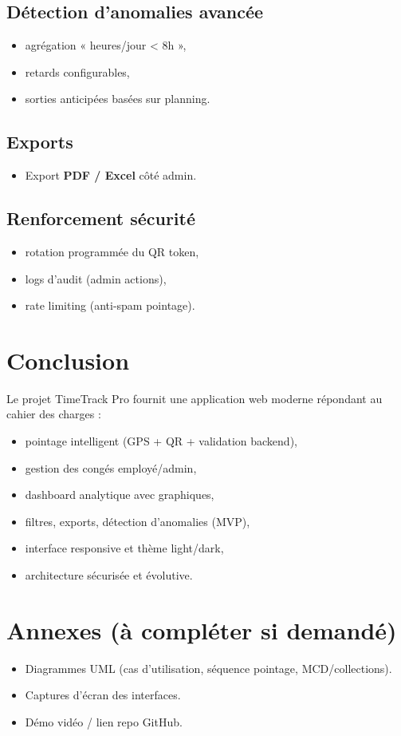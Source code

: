 \documentclass[12pt,a4paper]{article}
\begin{document}
\subsection{Détection d’anomalies avancée}
\begin{itemize}[leftmargin=*]
  \item agrégation « heures/jour < 8h »,
  \item retards configurables,
  \item sorties anticipées basées sur planning.
\end{itemize}

\subsection{Exports}
\begin{itemize}[leftmargin=*]
  \item Export \textbf{PDF / Excel} côté admin.
\end{itemize}

\subsection{Renforcement sécurité}
\begin{itemize}[leftmargin=*]
  \item rotation programmée du QR token,
  \item logs d’audit (admin actions),
  \item rate limiting (anti-spam pointage).
\end{itemize}

\section{Conclusion}
Le projet TimeTrack Pro fournit une application web moderne répondant au cahier des charges :
\begin{itemize}[leftmargin=*]
  \item pointage intelligent (GPS + QR + validation backend),
  \item gestion des congés employé/admin,
  \item dashboard analytique avec graphiques,
  \item filtres, exports, détection d’anomalies (MVP),
  \item interface responsive et thème light/dark,
  \item architecture sécurisée et évolutive.
\end{itemize}

\section*{Annexes (à compléter si demandé)}
\begin{itemize}[leftmargin=*]
  \item Diagrammes UML (cas d’utilisation, séquence pointage, MCD/collections).
  \item Captures d’écran des interfaces.
  \item Démo vidéo / lien repo GitHub.
\end{itemize}
\end{document}
